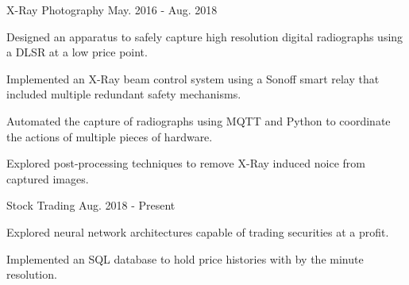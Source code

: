 
\begin{cventries}

  \cventry
    {}
    {X-Ray Photography} %
    {} %
    {May. 2016 - Aug. 2018} %
    {
      \begin{cvitems} %
        \item {
			Designed an apparatus to safely capture high resolution
			digital radiographs using a DLSR at a low price point.
		}
        \item {
			Implemented an X-Ray beam control system using a Sonoff
			smart relay that included multiple redundant safety mechanisms.
		}
        \item {
			Automated the capture of radiographs using MQTT and Python
			to coordinate the actions of multiple pieces of hardware.
		}
		\item {
			Explored post-processing techniques to remove X-Ray induced
			noice from captured images.
		}
      \end{cvitems}
    }
  \cventry
    {}
	{Stock Trading}
	{}
    {Aug. 2018 - Present} %
    {
      \begin{cvitems} %
        \item {
			Explored neural network architectures capable of trading
			securities at a profit.
		}
        \item {
			Implemented an SQL database to hold price histories with
			by the minute resolution.
		}
      \end{cvitems}
    }
\end{cventries}
